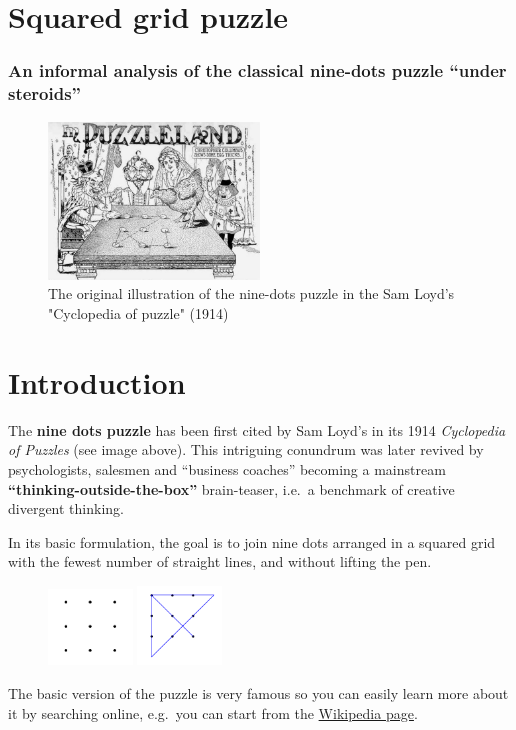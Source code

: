 \documentclass[11pt]{article}
\begin{document}
	\section{Squared grid puzzle}
	\subsubsection{An informal analysis of the classical nine-dots puzzle	``under steroids''}

	\begin{figure}[H]
		\centering
		\includegraphics[width=0.5\textwidth]{images/egg_puzzle.jpg}
		\caption{The original illustration of the nine-dots puzzle in the Sam Loyd's "Cyclopedia of puzzle" (1914)}
	\end{figure}

	\hypertarget{introduction} {
		\section{Introduction}
		\label{introduction}
	}
	The \textbf{nine dots puzzle} has been first cited by Sam Loyd's in its
	1914 \emph{Cyclopedia of Puzzles} (see image above). This intriguing
	conundrum was later revived by psychologists, salesmen and ``business
	coaches'' becoming a mainstream \textbf{``thinking-outside-the-box''}
	brain-teaser, i.e.~a benchmark of creative divergent thinking.

	In its basic formulation, the goal is to join nine dots arranged in a
	squared grid with the fewest number of straight lines, and without
	lifting the pen.
	\begin{figure}[H]
	\includegraphics[width=0.2\textwidth]{images/9-dots-grid.png}
	\includegraphics[width=0.2\textwidth]{images/9-dots-solution.png}
	\end{figure}
	The basic version of the puzzle is very famous so you can easily learn
	more about it by searching online, e.g.~you can start from the
	\href{https://en.wikipedia.org/wiki/Thinking_outside_the_box}{Wikipedia
	page}.
\end{document}
